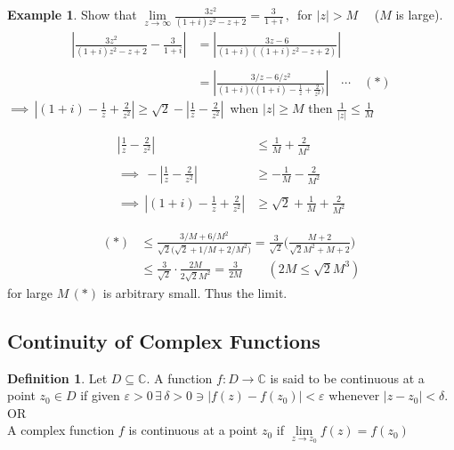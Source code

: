 \documentclass[11pt,a4paper]{article}
\theoremstyle{definition}
\newtheorem{definition}[thm]{Definition}
\newtheorem{example}[thm]{Example}
\begin{document}
\begin{example}
Show that $\displaystyle{\lim\limits_{z\rightarrow \infty} \frac{3z^2}{(1 + i) z^2 - z + 2} = \frac{3}{1 + i}}\,,\,$ for $\left|z\right| > M\quad $ ($M$ is large).\\

\begin{align*}
\left|\frac{3z^2}{(1 + i)z^2 - z + 2} - \frac{3}{1 + i}\right| & = \left|\frac{3z - 6}{(1 + i) ((1 + i)z^2 - z + 2)}\right|\\\\
& = \left|\frac{3/z - 6/z^2}{(1 + i)\Big((1 + i)- \frac{1}{z} + \frac{2}{z^2}\Big)}\right|\quad \cdots\quad  (*)
\end{align*}
$\implies\,\displaystyle{\left|(1 + i) - \frac{1}{z} + \frac{2}{z^2}\right|\geq \sqrt{2}- \left|\frac{1}{z} - \frac{2}{z^2}\right|\,}$ when $\left|z\right|\geq M$ then $\frac{1}{\left|z\right|} \leq \frac{1}{M}$

\begin{align*}
\left|\frac{1}{z} - \frac{2}{z^2}\right| & \leq \frac{1}{M} + \frac{2}{M^2}\\\\
\implies \,
-\left|\frac{1}{z} - \frac{2}{z^2}\right| & \geq -\frac{1}{M} - \frac{2}{M^2}\\\\
\implies\,
\left|(1 + i)- \frac{1}{z} + \frac{2}{z^2}\right| & \geq \sqrt{2} +  \frac{1}{M} + \frac{2}{M^2}
\end{align*}


\begin{align*}
(*)& \leq \frac{3/M + 6/M^2}{\sqrt{2}\Big(\sqrt{2} + 1/M + 2/M^2\Big)} = \frac{3}{\sqrt{2}}\Bigg(\frac{M + 2}{\sqrt{2}M^2 + M + 2}\Bigg)\\
&\leq \frac{3}{\sqrt{2}}\cdot \frac{2M}{2\sqrt{2}M^2} = \frac{3}{2M}\qquad  (2M \leq \sqrt{2}M^3)
\end{align*}
for large $M \, (*)$ is arbitrary small. Thus the limit.\
\end{example}

{\color[wave]{485}\subsection{Continuity of Complex Functions}}


\begin{definition}
Let $D\subseteq \mathbb{C}$. A function $f: D \longrightarrow \mathbb{C}$ is said to be continuous at a point $z_0\in D$ if given $\varepsilon > 0 \,\exists \,\delta > 0 \ni \left|f(z) - f(z_0)\right| < \varepsilon$ whenever $\left|z - z_0\right| < \delta$.\\


OR\\

A complex function $f$ is continuous at a point $z_0$ if $\lim\limits_{z\rightarrow z_0}f(z) = f(z_0)$
\end{definition}
\end{document}
